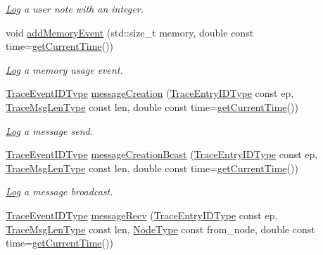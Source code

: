 \begin{DoxyCompactItemize}
\begin{DoxyCompactList}\small\item\em \hyperlink{structvt_1_1trace_1_1_log}{Log} a user note with an integer. \end{DoxyCompactList}\item 
void \hyperlink{structvt_1_1trace_1_1_trace_abc497f6fa641ac1c2c20889815b06dbc}{add\+Memory\+Event} (std\+::size\+\_\+t memory, double const time=\hyperlink{structvt_1_1trace_1_1_trace_lite_ad1d8159d645a3b7047ce3f2e0c080f8d}{get\+Current\+Time}())
\begin{DoxyCompactList}\small\item\em \hyperlink{structvt_1_1trace_1_1_log}{Log} a memory usage event. \end{DoxyCompactList}\item 
\hyperlink{namespacevt_1_1trace_a64a7185f3e102df8d8258f263ccd1582}{Trace\+Event\+I\+D\+Type} \hyperlink{structvt_1_1trace_1_1_trace_a5b5091197568d7ed104bb40d68b4ddd7}{message\+Creation} (\hyperlink{namespacevt_1_1trace_a3c14050715ba9eceaeff51fb3de64f2f}{Trace\+Entry\+I\+D\+Type} const ep, \hyperlink{namespacevt_1_1trace_aeb598f45d67d41db7902e494f2f0ce59}{Trace\+Msg\+Len\+Type} const len, double const time=\hyperlink{structvt_1_1trace_1_1_trace_lite_ad1d8159d645a3b7047ce3f2e0c080f8d}{get\+Current\+Time}())
\begin{DoxyCompactList}\small\item\em \hyperlink{structvt_1_1trace_1_1_log}{Log} a message send. \end{DoxyCompactList}\item 
\hyperlink{namespacevt_1_1trace_a64a7185f3e102df8d8258f263ccd1582}{Trace\+Event\+I\+D\+Type} \hyperlink{structvt_1_1trace_1_1_trace_ad034b14649101fb530eccfb4e2b958ce}{message\+Creation\+Bcast} (\hyperlink{namespacevt_1_1trace_a3c14050715ba9eceaeff51fb3de64f2f}{Trace\+Entry\+I\+D\+Type} const ep, \hyperlink{namespacevt_1_1trace_aeb598f45d67d41db7902e494f2f0ce59}{Trace\+Msg\+Len\+Type} const len, double const time=\hyperlink{structvt_1_1trace_1_1_trace_lite_ad1d8159d645a3b7047ce3f2e0c080f8d}{get\+Current\+Time}())
\begin{DoxyCompactList}\small\item\em \hyperlink{structvt_1_1trace_1_1_log}{Log} a message broadcast. \end{DoxyCompactList}\item 
\hyperlink{namespacevt_1_1trace_a64a7185f3e102df8d8258f263ccd1582}{Trace\+Event\+I\+D\+Type} \hyperlink{structvt_1_1trace_1_1_trace_aa14d58fb03a226e213f72bb03a13bb9f}{message\+Recv} (\hyperlink{namespacevt_1_1trace_a3c14050715ba9eceaeff51fb3de64f2f}{Trace\+Entry\+I\+D\+Type} const ep, \hyperlink{namespacevt_1_1trace_aeb598f45d67d41db7902e494f2f0ce59}{Trace\+Msg\+Len\+Type} const len, \hyperlink{namespacevt_a866da9d0efc19c0a1ce79e9e492f47e2}{Node\+Type} const from\+\_\+node, double const time=\hyperlink{structvt_1_1trace_1_1_trace_lite_ad1d8159d645a3b7047ce3f2e0c080f8d}{get\+Current\+Time}())

\end{DoxyCompactItemize}
